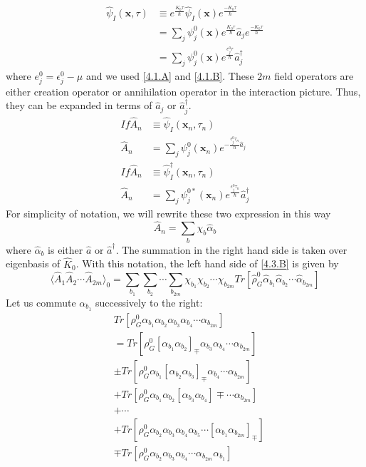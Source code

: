 \begin{equation}
\begin{aligned}
\hat{\psi}_I(\mathbf{x},\tau)&\equiv e^\frac{K_0\tau}{\hbar}\hat{\psi}_I(\mathbf{x})e^\frac{-K_0\tau}{\hbar}\\
&=\sum_j\psi_j^0(\mathbf{x})e^\frac{K_0\tau}{\hbar} \hat{a}_j e^\frac{-K_0\tau}{\hbar}\\
&=\sum_j\psi_j^0(\mathbf{x}) e^\frac{e_j^0\tau}{\hbar} \hat{a}_j^\dagger
\end{aligned}
\end{equation}
where $e_j^0=\epsilon_j^0-\mu$ and we used \ref{4.1.A} and \ref{4.1.B}.
These $2m$ field operators are either creation operator or annihilation operator in the interaction picture.
Thus, they can be expanded in terms of $\hat{a}_j$ or $\hat{a}_j^\dagger$.
$$
\begin{aligned}
If \hat{A}_n &\equiv \hat{\psi}_I(\mathbf{x}_n,\tau_n)\\
\hat{A}_n&=\sum_j \psi_j^0(\mathbf{x}_n) e^{-\frac{\epsilon_j^0\tau_n}{\hbar} \hat{a}_j}\\
If \hat{A}_n &\equiv \hat{\psi}^\dagger_I(\mathbf{x}_n,\tau_n)\\
\hat{A}_n&=\sum_j \psi_j^{0*}(\mathbf{x}_n) e^\frac{\epsilon_j^0\tau_n}{\hbar} \hat{a}_j^\dagger
\end{aligned}
$$
For simplicity of notation, we will rewrite these two expression in this way
$$
\hat{A}_n=\sum_b \chi_b\hat{\alpha}_b
$$
where $\hat{\alpha}_b$ is either $\hat{a}$ or $\hat{a}^\dagger$.
The summation in the right hand side is taken over eigenbasis of $\hat{K}_0$.
With this notation, the left hand side of \ref{4.3.B} is given by
\begin{equation}\label{4.3.C}
\langle\hat A_1 \hat A_2 \cdots \hat A_{2m}\rangle_0=\sum_{b_1}\sum_{b_2}\cdots\sum_{b_{2m}} \chi_{b_1}\chi_{b_2}\cdots\chi_{b_{2m}}Tr[\hat{\rho}_G^0\hat{\alpha}_{b_1} \hat{\alpha}_{b_2} \cdots \hat{\alpha}_{b_{2m}}]
\end{equation}
Let us commute $\alpha_{b_1}$ successively to the right:
$$
\begin{aligned}
&Tr[\rho_G^0\alpha_{b_1}\alpha_{b_2}\alpha_{b_3}\alpha_{b_4}\cdots\alpha_{b_{2m}}]\\
&=Tr[\rho_G^0[\alpha_{b_1}\alpha_{b_2}]_\mp\alpha_{b_3}\alpha_{b_4}\cdots\alpha_{b_{2m}}]\\
&\pm Tr[\rho_G^0\alpha_{b_1}[\alpha_{b_2}\alpha_{b_3}]_\mp\alpha_{b_4}\cdots\alpha_{b_{2m}}]\\
&+Tr[\rho_G^0\alpha_{b_1}\alpha_{b_2}[\alpha_{b_3}\alpha_{b_4}]\mp\cdots\alpha_{b_{2m}}]\\
&+\cdots\\
&+Tr[\rho_G^0\alpha_{b_2}\alpha_{b_3}\alpha_{b_4}\alpha_{b_5}\cdots[\alpha_{b_1}\alpha_{b_{2m}}]_\mp]\\
&\mp Tr[\rho_G^0\alpha_{b_2}\alpha_{b_3}\alpha_{b_4}\cdots\alpha_{b_{2m}}\alpha_{b_1}]
\end{aligned}
$$
